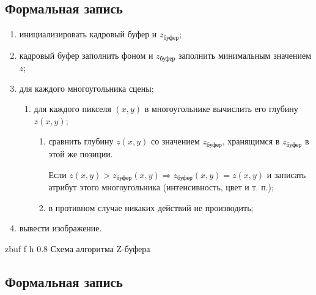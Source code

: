 \subsection{Формальная запись}
\begin{enumerate}
	\item инициализировать кадровый буфер и $z_{\text{буфер}}$;
	\item кадровый буфер заполнить фоном и $z_{\text{буфер}}$ заполнить  минимальным значением $z$;
	\item для каждого многоугольника сцены;
	\begin{enumerate}[label=\arabic{enumi}.\arabic*]
		\item  для каждого пикселя $(x, y)$ в многоугольнике вычислить его глубину $z(x, y)$;
		\begin{enumerate}
			\item  сравнить глубину $z(x, y)$ со значением  $z_{\text{буфер}}$, хранящимся в $z_{\text{буфер}}$ в этой же позиции. 
			
			Если  $z(x, y) > z_{\text{буфер}}(x, y) \Rightarrow z_{\text{буфер}}(x, y) = z(x, y) $ и записать атрибут этого многоугольника (интенсивность, цвет и т. п.);
			
			\item в противном случае никаких действий не производить;
		\end{enumerate}
	\end{enumerate}
	
	\item вывести изображение.
\end{enumerate}

\clearpage

\fi 


	{zbuf} %
	{f} %
	{h} %
	{0.8\textwidth} %
	{Схема алгоритма Z-буфера} %
\clearpage


\subsection{Формальная запись}

